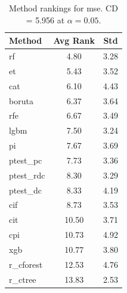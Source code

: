 \begin{table}[h]
\centering
\caption{Method rankings for mse. CD = 5.956 at $\alpha=0.05$.}
\label{tab:ranks_mse}
\begin{tabular}{lcc}
\toprule
Method & Avg Rank & Std \\
\midrule
rf & 4.80 & 3.28 \\
et & 5.43 & 3.52 \\
cat & 6.10 & 4.43 \\
boruta & 6.37 & 3.64 \\
rfe & 6.67 & 3.49 \\
lgbm & 7.50 & 3.24 \\
pi & 7.67 & 3.69 \\
ptest_pc & 7.73 & 3.36 \\
ptest_rdc & 8.30 & 3.29 \\
ptest_dc & 8.33 & 4.19 \\
cif & 8.73 & 3.53 \\
cit & 10.50 & 3.71 \\
cpi & 10.73 & 4.92 \\
xgb & 10.77 & 3.80 \\
r_cforest & 12.53 & 4.76 \\
r_ctree & 13.83 & 2.53 \\
\bottomrule
\end{tabular}
\end{table}
